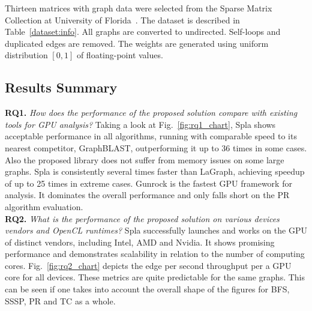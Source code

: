 Thirteen matrices with graph data were selected from the Sparse Matrix Collection at University of Florida~\cite{dataset:10.1145/2049662.2049663}. 
The dataset is described in Table~\ref{dataset:info}. 
All graphs are converted to undirected.
Self-loops and duplicated edges are removed. 
The weights are generated using uniform distribution $[0, 1]$ of floating-point values.

\subsection{Results Summary}

\textbf{RQ1.} \textit{How does the performance of the proposed solution compare with existing tools for GPU analysis?} Taking a look at Fig.~\ref{fig:rq1_chart}, Spla shows acceptable performance in all algorithms, running with comparable speed to its nearest competitor, GraphBLAST, outperforming it up to 36 times in some cases. Also the proposed library does not suffer from memory issues on some large graphs. Spla is consistently several times faster than LaGraph, achieving speedup of up to 25 times in extreme cases. Gunrock is the fastest GPU framework for analysis. It dominates the overall performance and only falls short on the PR algorithm evaluation.\\

\textbf{RQ2.} \textit{What is the performance of the proposed solution on various devices vendors and OpenCL runtimes?} Spla successfully launches and works on the GPU of distinct vendors, including Intel, AMD and Nvidia. It shows promising performance and demonstrates scalability in relation to the number of computing cores. Fig.~\ref{fig:rq2_chart} depicts the edge per second throughput per a GPU core for all devices. These metrics are quite predictable for the same graphs. This can be seen if one takes into account the overall shape of the figures for BFS, SSSP, PR and TC as a whole.